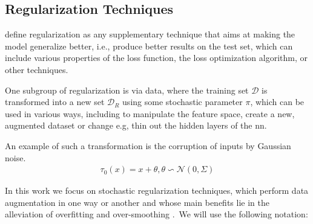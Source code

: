 \subsection{Regularization Techniques}
\label{sec:related:pred:regularization}

\citet{Kukacka2017} define regularization as any supplementary technique that aims at making the model generalize better, i.e., produce better results on the test set, which can include various properties of the loss function, the loss optimization algorithm, or other techniques.

One subgroup of regularization is via data, where the training set $\mathcal{D}$ is
transformed into a new set $\mathcal{D}_{R}$ using some stochastic parameter
$\pi$, which can be used in various ways, including to manipulate the feature space,
create a new, augmented dataset or change e.g, thin out the hidden layers of
the \ac{nn}.

An example of such a transformation is the corruption of inputs by Gaussian noise.
\begin{align*}
    \tau_{0}(x) = x + \theta, \theta \backsim \mathcal{N}(0, \Sigma)
\end{align*}

In this work we focus on stochastic regularization techniques, which perform
data augmentation in one way or another and whose main benefits lie in the alleviation
of overfitting and over-smoothing \cite{Hasanzadeh2020}.\
We will use the following notation: \

